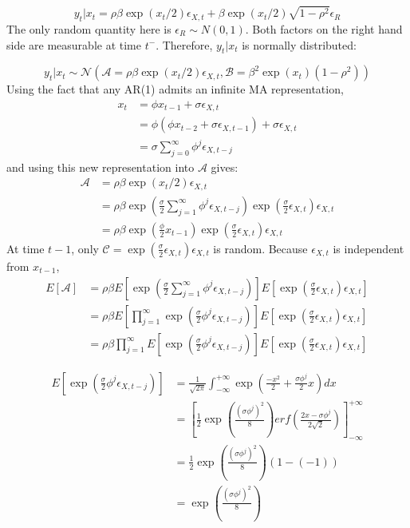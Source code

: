 \documentclass[11pt,a4,twosided,singlespacing,titlepagenumber=on]{scrreprt}
\numberwithin{equation}{chapter} %
\theoremstyle{remark}
\begin{document}
$$y_t | x_t = \rho \beta \exp(x_t / 2) \epsilon_{X,t} + \beta \exp(x_t / 2) \sqrt{1-\rho^2} \epsilon_R$$
The only random quantity here is $\epsilon_R \sim N(0,1)$. Both factors on the right hand side are measurable at time $t^-$. Therefore, $y_t|x_t$ is normally distributed:

$$y_t | x_t \sim \mathcal{N}\left(\mathcal{A} = \rho \beta \exp(x_t / 2) \epsilon_{X,t}, \mathcal{B} = \beta^2 \exp(x_t) (1-\rho^2)\right)$$
Using the fact that any AR(1) admits an infinite MA representation,
\begin{align*}
x_t &= \phi x_{t-1} + \sigma \epsilon_{X,t} \\ 
	&= \phi(\phi x_{t-2} +\sigma \epsilon_{X,t-1}) + \sigma \epsilon_{X,t} \\
    &= \sigma \sum_{j=0}^\infty \phi^j \epsilon_{X, t-j}
\end{align*}
and using this new representation into $\mathcal{A}$ gives:
\begin{align*}
\mathcal{A} &= \rho \beta \exp(x_t / 2) \epsilon_{X,t} \\
			&= \rho \beta \exp \left( \frac{\sigma}{2} \sum_{j=1}^\infty \phi^j \epsilon_{X, t-j}\right) \exp \left( \frac{\sigma}{2} \epsilon_{X,t} \right) \epsilon_{X,t} \\
			&= \rho \beta \exp \left( \frac{\phi}{2} x_{t-1}\right) \exp \left( \frac{\sigma}{2} \epsilon_{X,t} \right) \epsilon_{X,t}
\end{align*}
At time $t-1$, only $\mathcal{C} = \exp \left( \frac{\sigma}{2} \epsilon_{X,t} \right) \epsilon_{X,t}$ is random. Because $\epsilon_{X,t}$ is independent from $x_{t-1}$,
\begin{align*}
E[\mathcal{A}] &= \rho \beta E\left[\exp \left( \frac{\sigma}{2} \sum_{j=1}^\infty \phi^j \epsilon_{X, t-j}\right)\right] E\left[\exp \left( \frac{\sigma}{2} \epsilon_{X,t} \right) \epsilon_{X,t} \right] \\
			   &= \rho \beta E\left[\prod_{j=1}^\infty \exp \left( \frac{\sigma}{2} \phi^j \epsilon_{X, t-j} \right)  \right] E\left[\exp \left( \frac{\sigma}{2} \epsilon_{X,t} \right) \epsilon_{X,t} \right] \\
			   &= \rho \beta \prod_{j=1}^\infty E\left[\exp \left( \frac{\sigma}{2} \phi^j \epsilon_{X, t-j} \right)  \right]  E\left[\exp \left( \frac{\sigma}{2} \epsilon_{X,t} \right) \epsilon_{X,t} \right]
\end{align*}

\begin{align*}
E\left[\exp \left( \frac{\sigma}{2} \phi^j \epsilon_{X, t-j} \right) \right] &= \frac{1}{\sqrt{2\pi}} \int^{+\infty}_{-\infty} \exp \left(\frac{-x^2}{2} + \frac{\sigma \phi^j}{2} x \right) dx \\
																			 &= \left[ \frac{1}{2} \exp \left(\frac{(\sigma\phi^j)^2}{8} \right) erf \left( \frac{2x- \sigma\phi^j}{2 \sqrt{2}} \right) \right]^{+\infty}_{-\infty} \\
																			 &= \frac{1}{2} \exp \left(\frac{(\sigma\phi^j)^2}{8} \right) (1 - (-1)) \\
																			 &= \exp \left(\frac{(\sigma\phi^j)^2}{8} \right)
\end{align*}
\end{document}
